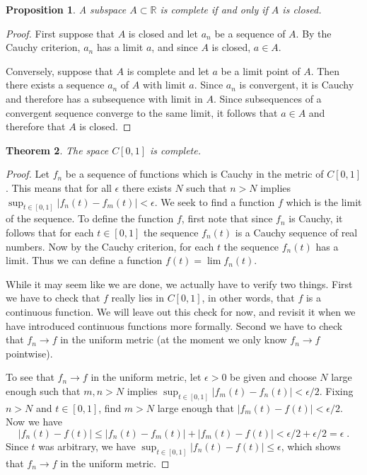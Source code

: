 \documentclass[11pt,oneside]{amsbook}
\newcommand{\R}{\mathbb R}
\theoremstyle{definition}
\theoremstyle{plain}
\newtheorem{theorem}{Theorem}[section]
\newtheorem{proposition}[theorem]{Proposition}
\theoremstyle{definition}
\theoremstyle{remark}
\numberwithin{equation}{section}
\numberwithin{figure}{section}
\begin{document}
\begin{proposition}
  A subspace $A\subset\R$ is complete if and only if $A$ is closed.
\end{proposition}

\begin{proof}
  First suppose that $A$ is closed and let $a_n$ be a sequence of $A$. By the Cauchy criterion, $a_n$ has a limit $a$, and since $A$ is closed, $a\in A$. 

  Conversely, suppose that $A$ is complete and let $a$ be a limit point of $A$. Then there exists a sequence $a_n$ of $A$ with limit $a$. Since $a_n$ is convergent, it is Cauchy and therefore has a subsequence with limit in $A$. Since subsequences of a convergent sequence converge to the same limit, it follows that $a\in A$ and therefore that $A$ is closed.
\end{proof}

\begin{theorem}
  The space $C[0,1]$ is complete.
\end{theorem}

\begin{proof}
  Let $f_n$ be a sequence of functions which is Cauchy in the metric of $C[0,1]$. This means that for all $\epsilon$ there exists $N$ such that $n>N$ implies $\sup_{t\in[0,1]}|f_n(t)-f_m(t)|<\epsilon$. We seek to find a function $f$ which is the limit of the sequence. To define the function $f$, first note that since $f_n$ is Cauchy, it follows that for each $t\in[0,1]$ the sequence $f_n(t)$ is a Cauchy sequence of real numbers. Now by the Cauchy criterion, for each $t$ the sequence $f_n(t)$ has a limit. Thus we can define a function $f(t)=\lim f_n(t)$.

  While it may seem like we are done, we actually have to verify two things. First we have to check that $f$ really lies in $C[0,1]$, in other words, that $f$ is a continuous function. We will leave out this check for now, and revisit it when we have introduced continuous functions more formally. Second we have to check that $f_n\to f$ in the uniform metric (at the moment we only know $f_n\to f$ pointwise).

  To see that $f_n\to f$ in the uniform metric, let $\epsilon>0$ be given and choose $N$ large enough such that $m,n>N$ implies $\sup_{t\in[0,1]}|f_m(t)-f_n(t)|<\epsilon/2$. Fixing $n>N$ and $t\in[0,1]$, find $m>N$ large enough that $|f_m(t)-f(t)|<\epsilon/2$. Now we have
\[|f_n(t)-f(t)|\leq|f_n(t)-f_m(t)|+|f_m(t)-f(t)|<\epsilon/2+\epsilon/2=\epsilon\;.
\]
Since $t$ was arbitrary, we have $\sup_{t\in[0,1]}|f_n(t)-f(t)|\leq\epsilon$, which shows that $f_n\to f$ in the uniform metric.
\end{proof}
\end{document}
